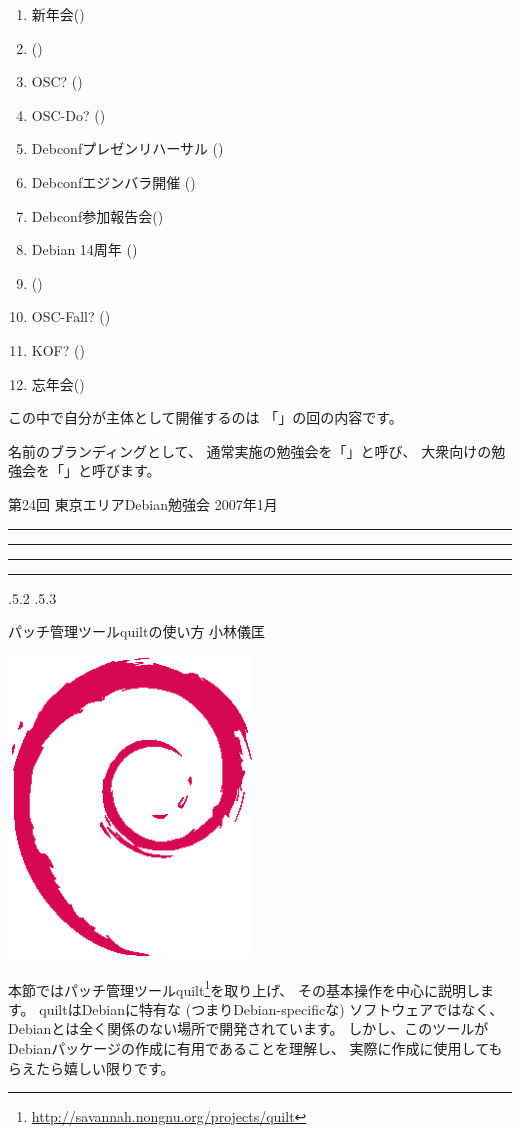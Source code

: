 \documentclass[mingoth,a4paper,twoside]{jsarticle}
\makeatletter
\newcommand{\debmtgyear}{2007}
\newcommand{\debmtgmonth}{1}
\newcommand{\debmtgnumber}{24}
\renewcommand{\section}{\@startsection{section}{1}{\z@}%
    {\Cvs \@plus.5\Cdp \@minus.2\Cdp}%
    {.5\Cvs \@plus.3\Cdp}%
    {\normalfont\gt\fontsize{32}{32}\headfont\raggedright}} %
\newcommand{\dancersection}[2]{%
\newpage
第\debmtgnumber{}回 東京エリアDebian勉強会 \debmtgyear{}年\debmtgmonth{}月
\hrule
\vspace{0.5mm}
\hrule
%
\vspace{4cm}
\hrule
\vspace{0.5mm}
\hrule
%
\vspace{-7cm}
\begin{minipage}[b]{0.7\hsize}
\section{#1}
\hfill{}#2\\
\vspace{2cm}
\end{minipage}
\begin{minipage}[b]{0.3\hsize}
\hfill{}\includegraphics[height=8cm]{image200502/openlogo-nd.eps}\\
\end{minipage}
%
\vspace{-1cm}
}
\makeatother
\begin{document}
{\begin{enumerate}
 \item 新年会(\underline{\hspace{8cm}})
 \item (\underline{\hspace{8cm}})
 \item OSC? (\underline{\hspace{8cm}})
 \item OSC-Do? (\underline{\hspace{8cm}})
 \item Debconfプレゼンリハーサル (\underline{\hspace{8cm}})
 \item Debconfエジンバラ開催 (\underline{\hspace{8cm}})
 \item Debconf参加報告会(\underline{\hspace{8cm}})
 \item Debian 14周年 (\underline{\hspace{8cm}})
 \item (\underline{\hspace{8cm}})
 \item OSC-Fall? (\underline{\hspace{8cm}})
 \item KOF? (\underline{\hspace{8cm}})
 \item 忘年会(\underline{\hspace{8cm}})
\end{enumerate}

この中で自分が主体として開催するのは
「\underline{\hspace{8cm}}」の回の内容です。

名前のブランディングとして、
通常実施の勉強会を「\underline{\hspace{8cm}}」と呼び、
大衆向けの勉強会を「\underline{\hspace{8cm}}」と呼びます。

}

\dancersection{パッチ管理ツールquiltの使い方}{小林儀匡}

本節ではパッチ管理ツールquilt\footnote{\url{http://savannah.nongnu.org/projects/quilt}}を取り上げ、
その基本操作を中心に説明します。
quiltはDebianに特有な (つまりDebian-specificな) ソフトウェアではなく、
Debianとは全く関係のない場所で開発されています。
しかし、このツールがDebianパッケージの作成に有用であることを理解し、
実際に作成に使用してもらえたら嬉しい限りです。
\end{document}
